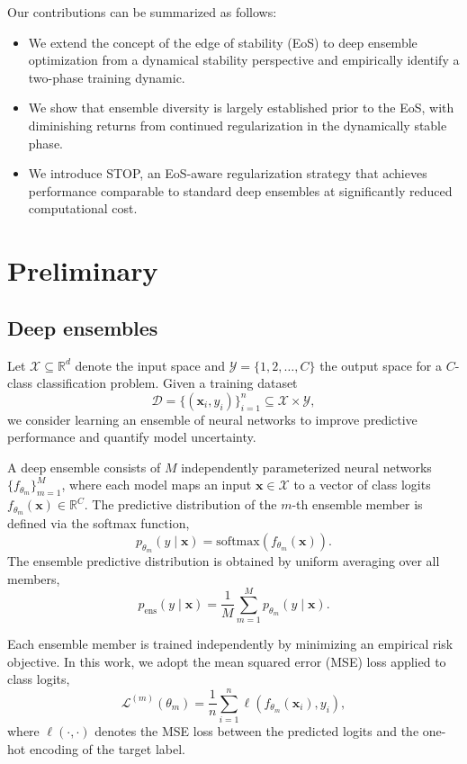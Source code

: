 \documentclass[sigconf]{acmart}
\begin{document}
Our contributions can be summarized as follows:
\begin{itemize}
\item We extend the concept of the edge of stability (EoS) to deep ensemble optimization from a dynamical stability perspective and empirically identify a two-phase training dynamic.
\item We show that ensemble diversity is largely established prior to the EoS, with diminishing returns from continued regularization in the dynamically stable phase.
\item We introduce STOP, an EoS-aware regularization strategy that achieves performance comparable to standard deep ensembles at significantly reduced computational cost.
\end{itemize}


\section{Preliminary}
\label{sec:preliminaries}

\subsection{Deep ensembles}
Let $\mathcal{X} \subseteq \mathbb{R}^d$ denote the input space and $\mathcal{Y} = \{1, 2, \dots, C\}$ the output space for a $C$-class classification problem.
Given a training dataset
\[
\mathcal{D} = \{(\mathbf{x}_i, y_i)\}_{i=1}^n \subseteq \mathcal{X} \times \mathcal{Y},
\]
we consider learning an ensemble of neural networks to improve predictive performance and quantify model uncertainty.

A deep ensemble consists of $M$ independently parameterized neural networks $\{ f_{\theta_m} \}_{m=1}^M$, where each model maps an input $\mathbf{x} \in \mathcal{X}$ to a vector of class logits $f_{\theta_m}(\mathbf{x}) \in \mathbb{R}^C$.
The predictive distribution of the $m$-th ensemble member is defined via the softmax function,
\[
p_{\theta_m}(y \mid \mathbf{x}) = \mathrm{softmax}\!\left( f_{\theta_m}(\mathbf{x}) \right).
\]
The ensemble predictive distribution is obtained by uniform averaging over all members,
\[
p_{\mathrm{ens}}(y \mid \mathbf{x})
= \frac{1}{M} \sum_{m=1}^M p_{\theta_m}(y \mid \mathbf{x}).
\]


Each ensemble member is trained independently by minimizing an empirical risk objective.
In this work, we adopt the mean squared error (MSE) loss applied to class logits,
\begin{equation}
\mathcal{L}^{(m)}(\theta_m)
=
\frac{1}{n} \sum_{i=1}^n
\ell\!\left( f_{\theta_m}(\mathbf{x}_i), y_i \right),
\end{equation}
where $\ell(\cdot,\cdot)$ denotes the MSE loss between the predicted logits and the one-hot encoding of the target label.
\end{document}
